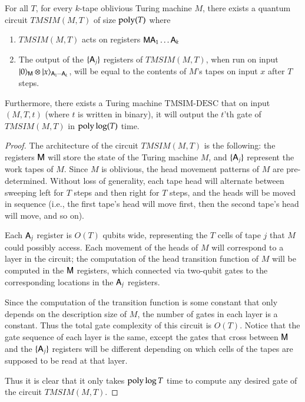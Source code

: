 \begin{lemma}\label{lem:tmsim}
	For all $T$, for every $k$-tape oblivious Turing machine $M$, there exists a quantum circuit $TMSIM(M,T)$ of size $\operatorname{poly}(T)$ where
	\begin{enumerate}
		\item $TMSIM(M,T)$ acts on registers ${\mathsf{M}} {\mathsf{A}}_1 \ldots {\mathsf{A}}_k$
		\item The output of the $\{{\mathsf{A}}_j\}$ registers of $TMSIM(M,T)$, when run on input $|0\rangle_{{\mathsf{M}}} \otimes |x\rangle_{{\mathsf{A}}_1 \cdots {\mathsf{A}}_k}$, will be equal to the contents of $M$'s tapes on input $x$ after $T$ steps.
	\end{enumerate}
	Furthermore, there exists a Turing machine $\text{TMSIM-DESC}$ that on input $(M,T,t)$ (where $t$ is written in binary), it will output the $t$'th gate of $TMSIM(M,T)$ in $\operatorname{poly}\log(T)$ time. 
\end{lemma}

\begin{proof}
	The architecture of the circuit $TMSIM(M,T)$ is the following: the registers ${\mathsf{M}}$ will store the state of the Turing machine $M$, and $\{{\mathsf{A}}_j\}$ represent the work tapes of $M$. Since $M$ is oblivious, the head movement patterns of $M$ are pre-determined. Without loss of generality, each tape head will alternate between sweeping left for $T$ steps and then right for $T$ steps, and the heads will be moved in sequence (i.e., the first tape's head will move first, then the second tape's head will move, and so on). 
	
	Each ${\mathsf{A}}_j$ register is $O(T)$ qubits wide, representing the $T$ cells of tape $j$ that $M$ could possibly access. Each movement of the heads of $M$ will correspond to a layer in the circuit; the computation of the head transition function of $M$ will be computed in the ${\mathsf{M}}$ registers, which connected via two-qubit gates to the corresponding locations in the ${\mathsf{A}}_j$ registers. 
	
	Since the computation of the transition function is some constant that only depends on the description size of $M$, the number of gates in each layer is a constant. Thus the total gate complexity of this circuit is $O(T)$. Notice that the gate sequence of each layer is the same, except the gates that cross between ${\mathsf{M}}$ and the $\{{\mathsf{A}}_j\}$ registers will be different depending on which cells of the tapes are supposed to be read at that layer. 
	
	Thus it is clear that it only takes $\operatorname{poly}\log T$ time to compute any desired gate of the circuit $TMSIM(M,T)$.
\end{proof}

